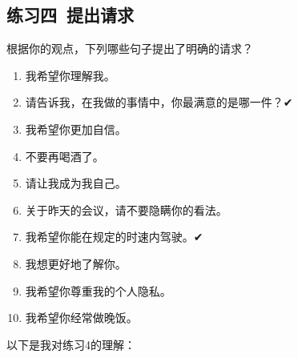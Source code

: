 \documentclass{ctexart}
\begin{document}
\subsection{练习四\ 提出请求}

根据你的观点，下列哪些句子提出了明确的请求？

\begin{enumerate}
	\item 我希望你理解我。
	\item 请告诉我，在我做的事情中，你最满意的是哪一件？✔
	\item 我希望你更加自信。
	\item 不要再喝酒了。
	\item 请让我成为我自己。
	\item 关于昨天的会议，请不要隐瞒你的看法。
	\item 我希望你能在规定的时速内驾驶。✔
	\item 我想更好地了解你。
	\item 我希望你尊重我的个人隐私。
	\item 我希望你经常做晚饭。
\end{enumerate}

以下是我对练习4的理解：
\end{document}
